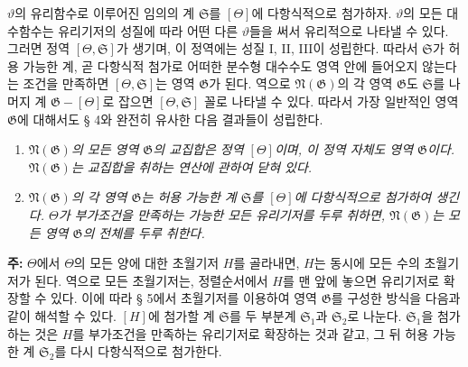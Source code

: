 $\vartheta$의 유리함수로 이루어진 임의의 계 $\mathfrak S$를 $[\Theta]$에 다항식적으로 첨가하자. $\vartheta$의 모든 대수함수는 유리기저의 성질에 따라 어떤 다른 $\vartheta$들을 써서 유리적으로 나타낼 수 있다. 그러면 정역 $[\Theta,\mathfrak S]$가 생기며, 이 정역에는 성질 I, II, III이 성립한다. 따라서 $\mathfrak S$가 \glqq{}허용 가능한 계\grqq{}, 곧 다항식적 첨가로 어떠한 분수형 대수수도 영역 안에 들어오지 않는다는 조건을 만족하면 $[\Theta,\mathfrak S]$는 영역 $\mathfrak G$가 된다. 역으로 $\mathfrak N(\mathfrak G)$의 각 영역 $\mathfrak G$도 $\mathfrak S$를 나머지 계 $\mathfrak G-[\Theta]$로 잡으면 $[\Theta,\mathfrak S]$ 꼴로 나타낼 수 있다. 따라서 가장 일반적인 영역 $\mathfrak G$에 대해서도 § 4와 완전히 유사한 다음 결과들이 성립한다.

\begin{enumerate}
\item[a)] \emph{$\mathfrak N(\mathfrak G)$의 모든 영역 $\mathfrak G$의 교집합은 정역 $[\Theta]$이며, 이 정역 자체도 영역 $\mathfrak G$이다. $\mathfrak N(\mathfrak G)$는 교집합을 취하는 연산에 관하여 닫혀 있다.}
\item[b)] \emph{$\mathfrak N(\mathfrak G)$의 각 영역 $\mathfrak G$는 허용 가능한 계 $\mathfrak S$를 $[\Theta]$에 다항식적으로 첨가하여 생긴다. $\Theta$가 부가조건을 만족하는 가능한 모든 유리기저를 두루 취하면, $\mathfrak N(\mathfrak G)$는 모든 영역 $\mathfrak G$의 전체를 두루 취한다.}
\end{enumerate}

\textbf{주:} $\Theta$에서 $\Theta$의 모든 양에 대한 초월기저 $H$를 골라내면, $H$는 동시에 모든 수의 초월기저가 된다. 역으로 모든 초월기저는, 정렬순서에서 $H$를 맨 앞에 놓으면 유리기저로 확장할 수 있다. 이에 따라 § 5에서 초월기저를 이용하여 영역 $\mathfrak G$를 구성한 방식을 다음과 같이 해석할 수 있다. $[H]$에 첨가할 계 $\mathfrak S$를 두 부분계 $\mathfrak S_1$과 $\mathfrak S_2$로 나눈다. $\mathfrak S_1$을 첨가하는 것은 $H$를 부가조건을 만족하는 유리기저로 확장하는 것과 같고, 그 뒤 허용 가능한 계 $\mathfrak S_2$를 다시 다항식적으로 첨가한다.

